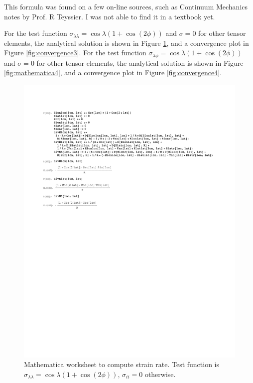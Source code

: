 \documentclass[11pt]{report}
\begin{document}
This formula was found on a few on-line sources, such as Continuum Mechanics notes by Prof. R Teyssier.  I was not able to find it in a textbook yet.

For the test function $\sigma_{\lambda\lambda}=\cos\lambda (1+\cos(2\phi))$ and $\sigma=0$ for other tensor elements, the analytical solution is shown in Figure \ref{fig:mathematica3}, and a convergence plot in Figure \ref{fig:convergence3}.  For the test function $\sigma_{\lambda\phi}=\cos\lambda (1+\cos(2\phi))$ and $\sigma=0$ for other tensor elements, the analytical solution is shown in Figure \ref{fig:mathematica4}, and a convergence plot in Figure \ref{fig:convergence4}. 


\begin{figure}[htbp]
 \center
 \includegraphics[scale=0.8, trim = 0 4in 0 0, clip]{f/130520_ELonLon_coscos.pdf}
 \caption{Mathematica worksheet to compute strain rate.  Test function is $\sigma_{\lambda\lambda}=\cos \lambda (1+\cos(2\phi))$, $\sigma_{ii}=0$ otherwise.}
 \label{fig:mathematica3}
\end{figure}
\end{document}
